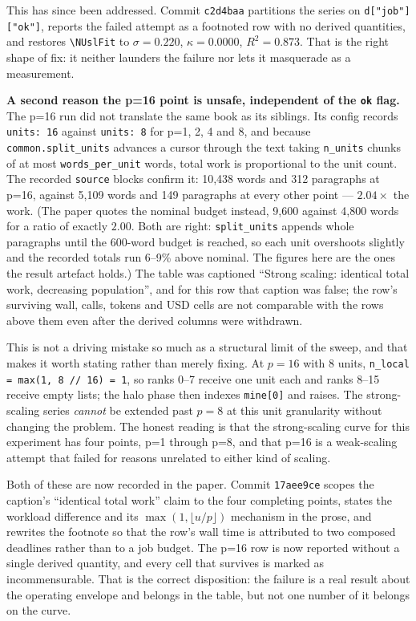 \documentclass[11pt]{article}
\begin{document}
This has since been addressed. Commit \texttt{c2d4baa} partitions the series on
\texttt{d["job"]["ok"]}, reports the failed attempt as a footnoted row with no derived
quantities, and restores \verb|\NUslFit| to $\sigma=0.220$, $\kappa=0.0000$, $R^2=0.873$.
That is the right shape of fix: it neither launders the failure nor lets it masquerade as
a measurement.

\textbf{A second reason the p=16 point is unsafe, independent of the \texttt{ok} flag.}
The p=16 run did not translate the same book as its siblings. Its config records
\texttt{units: 16} against \texttt{units: 8} for p=1, 2, 4 and 8, and because
\texttt{common.split\_units} advances a cursor through the text taking \texttt{n\_units}
chunks of at most \texttt{words\_per\_unit} words, total work is proportional to the unit
count. The recorded \texttt{source} blocks confirm it: 10{,}438 words and 312 paragraphs
at p=16, against 5{,}109 words and 149 paragraphs at every other point --- $2.04\times$
the work. (The paper quotes the nominal budget instead, 9{,}600 against 4{,}800 words for
a ratio of exactly $2.00$. Both are right: \texttt{split\_units} appends whole paragraphs
until the 600-word budget is reached, so each unit overshoots slightly and the recorded
totals run 6--9\% above nominal. The figures here are the ones the result artefact holds.)
The table was captioned ``Strong scaling: identical total work, decreasing population'',
and for this row that caption was false; the row's surviving wall, calls, tokens and USD
cells are not comparable with the rows above them even after the derived columns were
withdrawn.

This is not a driving mistake so much as a structural limit of the sweep, and that makes
it worth stating rather than merely fixing. At $p=16$ with 8 units, \texttt{n\_local =
max(1, 8 // 16) = 1}, so ranks 0--7 receive one unit each and ranks 8--15 receive empty
lists; the halo phase then indexes \texttt{mine[0]} and raises. The strong-scaling series
\emph{cannot} be extended past $p=8$ at this unit granularity without changing the
problem. The honest reading is that the strong-scaling curve for this experiment has four
points, p=1 through p=8, and that p=16 is a weak-scaling attempt that failed for reasons
unrelated to either kind of scaling.

Both of these are now recorded in the paper. Commit \texttt{17aee9ce} scopes the caption's
``identical total work'' claim to the four completing points, states the workload
difference and its $\max(1, \lfloor u/p \rfloor)$ mechanism in the prose, and rewrites the
footnote so that the row's wall time is attributed to two composed deadlines rather than
to a job budget. The p=16 row is now reported without a single derived quantity, and every
cell that survives is marked as incommensurable. That is the correct disposition: the
failure is a real result about the operating envelope and belongs in the table, but not one
number of it belongs on the curve.
\end{document}
